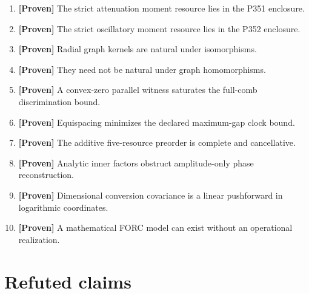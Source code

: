 \documentclass[11pt,a4paper,openany]{report}
\newcommand{\statusProven}{\textcolor{fingreen}{[Proven]}}
\begin{document}
\begin{enumerate}
\item 
\textbf{\statusProven{}} The strict attenuation moment resource lies in the P351 enclosure.

\item 
\textbf{\statusProven{}} The strict oscillatory moment resource lies in the P352 enclosure.

\item 
\textbf{\statusProven{}} Radial graph kernels are natural under isomorphisms.

\item 
\textbf{\statusProven{}} They need not be natural under graph homomorphisms.

\item 
\textbf{\statusProven{}} A convex-zero parallel witness saturates the full-comb discrimination bound.

\item 
\textbf{\statusProven{}} Equispacing minimizes the declared maximum-gap clock bound.

\item 
\textbf{\statusProven{}} The additive five-resource preorder is complete and cancellative.

\item 
\textbf{\statusProven{}} Analytic inner factors obstruct amplitude-only phase reconstruction.

\item 
\textbf{\statusProven{}} Dimensional conversion covariance is a linear pushforward in logarithmic coordinates.

\item 
\textbf{\statusProven{}} A mathematical FORC model can exist without an operational realization.

\end{enumerate}

\section{Refuted claims}
\end{document}

